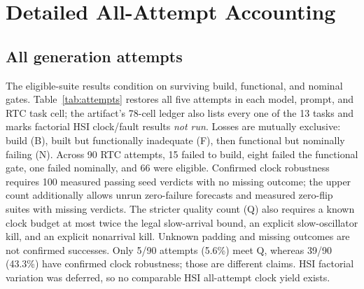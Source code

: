 \section{Detailed All-Attempt Accounting}\label{app:attempts}
\subsection{All generation attempts}
The eligible-suite results condition on surviving build, functional, and nominal gates. Table~\ref{tab:attempts} restores all five attempts in each model, prompt, and RTC task cell; the artifact's 78-cell ledger also lists every one of the 13 tasks and marks factorial HSI clock/fault results \emph{not run}. Losses are mutually exclusive: build (B), built but functionally inadequate (F), then functional but nominally failing (N). Across 90 RTC attempts, 15 failed to build, eight failed the functional gate, one failed nominally, and 66 were eligible. Confirmed clock robustness requires 100 measured passing seed verdicts with no missing outcome; the upper count additionally allows unrun zero-failure forecasts and measured zero-flip suites with missing verdicts. The stricter quality count (Q) also requires a known clock budget at most twice the legal slow-arrival bound, an explicit slow-oscillator kill, and an explicit nonarrival kill. Unknown padding and missing outcomes are not confirmed successes. Only 5/90 attempts (5.6\%) meet Q, whereas 39/90 (43.3\%) have confirmed clock robustness; those are different claims. HSI factorial variation was deferred, so no comparable HSI all-attempt clock yield exists.

